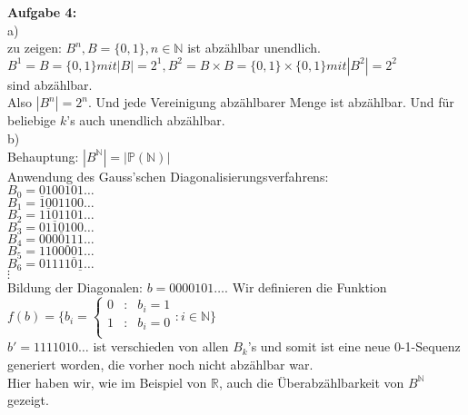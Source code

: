 \documentclass[a4paper]{scrartcl}
\begin{document}
	\begin{flushleft}
		\textbf{Aufgabe 4:}\\
		a)\\
		zu zeigen: $B^n, B=\{0,1\}, n\in \mathbb{N}$ ist abzählbar unendlich.\\[1em]
		$B^1 = B = \{0,1\} mit  |B| = 2^1, B^2 = B\times B = \{0,1\}\times \{0,1\} mit  |B^2| = 2^2$\\ sind abzählbar.\\
		Also $|B^n| = 2^n$. Und jede Vereinigung abzählbarer Menge ist abzählbar. Und für beliebige $k$'s auch unendlich abzählbar.\\ [1em]
		b)\\
		Behauptung:  $|B^{\mathbb{N}}| = |\mathbb{P}(\mathbb{N})|$\\
		Anwendung des Gauss'schen Diagonalisierungsverfahrens:\\ 
		$B_0 = \underline{0}100101\dots$\\
		$B_1 = 1\underline{0}01100\dots$\\
		$B_2 = 11\underline{0}1101\dots$\\
		$B_3 = 011\underline{0}100\dots$\\
		$B_4 = 0000\underline{1}11\dots$\\
		$B_5 = 11000\underline{0}1\dots$\\
		$B_6 = 011110\underline{1}\dots$\\
		$\vdots$\\
		Bildung der Diagonalen: $b = 0000101\dots$. Wir definieren die Funktion $f(b) = \{b_i = \left\{ \begin{array}{rcl}
		         0 & \mbox{:} & b_i = 1 \\
		         1 & \mbox{:} & b_i = 0 \\
                \end{array}\right.  : i\in \mathbb{N}\}$\\
        $b' = 1111010\dots$ ist verschieden von allen $B_k$'s und somit ist eine neue 0-1-Sequenz generiert worden, die vorher noch nicht abzählbar war.\\
        Hier haben wir, wie im Beispiel von $\mathbb{R}$, auch die Überabzählbarkeit  von $B^{\mathbb{N}}$gezeigt.\\
	\end{flushleft}
\end{document}
